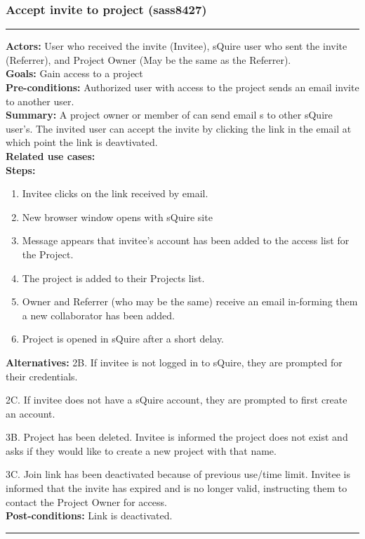\documentclass[11pt]{report}
\begin{document}
\subsubsection{Accept invite to project (sass8427)}
\vspace{2pt}
\hrule
\vspace{8pt}
 \textbf{Actors:} User who received the invite (Invitee), sQuire user who sent the invite (Referrer), and Project Owner (May be the same as the Referrer).  \\ 
 \textbf{Goals:} Gain access to a project \\
 \textbf{Pre-conditions:} Authorized user with access to the project sends an email invite to another user.   \\
\textbf{Summary:} A project owner or member of can send email s to other sQuire user's. The invited user can accept the invite by clicking the link in the email at which point the link is deavtivated. \\ 
 \textbf{Related use cases:} \\ 
 \textbf{Steps:} \begin{enumerate}
  \item Invitee clicks on the link received by email. 
  \item New browser window opens with sQuire site
  \item Message appears that invitee's account has been added to the access list for the Project.
  \item The project is added to their Projects list.
  \item Owner and Referrer (who may be the same) receive an email in-forming them a new collaborator has been added.
  \item Project is opened in sQuire after a short delay.
 \end{enumerate}
 \textbf{Alternatives:} 2B. If invitee is not logged in to sQuire, they are prompted for their credentials.
 
	2C. If invitee does not have a sQuire account, they are prompted to first create an account.
	
	3B. Project has been deleted. Invitee is informed the project does not exist and asks if they would like to create a new project with that name.
	
	3C. Join link has been deactivated because of previous use/time limit. Invitee is informed that the invite has expired and is no longer valid, instructing them to contact the Project Owner for access. \\
 \textbf{Post-conditions:} Link is deactivated.  \\
 \vspace{8pt}
\hrule
\newpage
\end{document}
